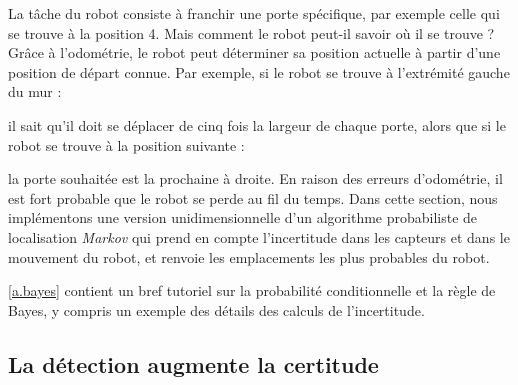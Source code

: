 La tâche du robot consiste à franchir une porte spécifique, par exemple celle qui se trouve à la position 4. Mais comment le robot peut-il savoir où il se trouve ? Grâce à l'odométrie, le robot peut déterminer sa position actuelle à partir d'une position de départ connue. Par exemple, si le robot se trouve à l'extrémité gauche du mur :
\begin{center}
\end{center}
il sait qu'il doit se déplacer de cinq fois la largeur de chaque porte, alors que si le robot se trouve à la position suivante :
\begin{center}
\end{center}
la porte souhaitée est la prochaine à droite. En raison des erreurs d'odométrie, il est fort probable que le robot se perde au fil du temps. Dans cette section, nous implémentons une version unidimensionnelle d'un algorithme probabiliste de localisation \emph{Markov} qui prend en compte l'incertitude dans les capteurs et dans le mouvement du robot, et renvoie les emplacements les plus probables du robot.

\ref{a.bayes} contient un bref tutoriel sur la probabilité conditionnelle et la règle de Bayes, y compris un exemple des détails des calculs de l'incertitude.

\subsection{La détection augmente la certitude}

